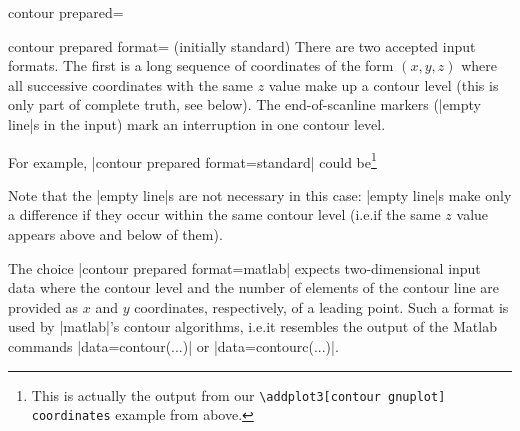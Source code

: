 {{\begin{plottype}[/pgfplots]{contour prepared=\textcolor{black}{}}
    \begin{pgfplotskey}{contour prepared format= (initially standard)}
        There are two accepted input formats. The first is a long sequence of
        coordinates of the form $(x,y,z)$ where all successive coordinates with
        the same $z$ value make up a contour level (this is only part of
        complete truth, see below). The end-of-scanline markers (|empty line|s
        in the input) mark an interruption in one contour level.

        For example, |contour prepared format=standard| could be\footnote{This
        is actually the output from our \texttt{\textbackslash addplot3[contour
        gnuplot] coordinates} example from above.}
\begin{codeexample}[]
\end{codeexample}
        \noindent Note that the |empty line|s are not necessary in this case:
        |empty line|s make only a difference if they occur within the same
        contour level (i.e.\@ if the same $z$ value appears above and below of
        them).

        The choice |contour prepared format=matlab| expects two-dimensional
        input data where the contour level and the number of elements of the
        contour line are provided as $x$ and $y$ coordinates, respectively, of
        a leading point. Such a format is used by |matlab|'s contour
        algorithms, i.e.\@ it resembles the output of the Matlab commands
        |data=contour(...)| or |data=contourc(...)|.


\end{pgfplotskey}
\end{plottype}}}
